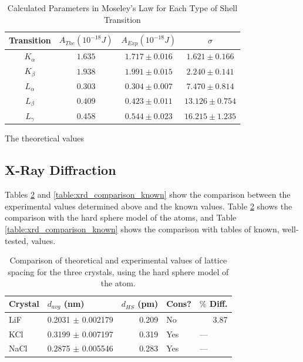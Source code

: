 \documentclass[%
 reprint,
 amsmath,amssymb,
 aps,
 pra,
]{revtex4-1}
\begin{document}
\begin{table}[htbp]
	\begin{center}
		\begin{tabular}{|c|c|c|c|}
			\hline Transition & $A_{The} (10^{-18} J)$  & $A_{Exp} (10^{-18} J) $ & $\sigma$ \\
			\hline $K_{\alpha}$ & $1.635$ & $1.717 \pm 0.016$ & $1.621 \pm 0.166$ \\
			\hline $K_{\beta}$ & $1.938$ & $1.991 \pm 0.015$ & $2.240 \pm 0.141$ \\
			\hline $L_{\alpha}$ & $0.303$ & $0.304 \pm 0.007$ & $7.470 \pm 0.814$ \\
			\hline $L_{\beta}$ & $0.409$ & $0.423 \pm 0.011$ & $13.126 \pm 0.754$ \\
			\hline $L_{\gamma}$ & $0.458$ & $0.544 \pm 0.023$ & $16.215 \pm 1.235$ \\
			\hline
		\end{tabular}
	\end{center}
	\caption{Calculated Parameters in Moseley's Law for Each Type of Shell Transition}
	\label{Tab:MoseLawSummary}
\end{table}

The theoretical values 

\subsection{X-Ray Diffraction}

Tables \ref{table:xrd_comparison_hard_sphere} and \ref{table:xrd_comparison_known} show the comparison between the experimental values determined above and the known values. Table \ref{table:xrd_comparison_hard_sphere} shows the comparison with the hard sphere model of the atoms, and Table \ref{table:xrd_comparison_known} shows the comparison with tables of known, well-tested, values.

\begin{table}[htbp]
	\begin{center}
	\begin{tabular}{|l|r|r|l|l|}
		\hline
		Crystal & \multicolumn{1}{l|}{$d_{avg}$ (nm)}  & \multicolumn{1}{l|}{$d_{HS}$ (pm)} & Cons? & $\%$ Diff. \\ \hline
		LiF & 0.2031 $\pm$ 0.002179 & 0.209 & No & \multicolumn{1}{r|}{3.87} \\ \hline
		KCl & 0.3199 $\pm$ 0.007197 & 0.319 & Yes & --- \\ \hline
		NaCl & 0.2875 $\pm$ 0.005546 & 0.283 & Yes & --- \\ \hline
	\end{tabular}
	\end{center}
	\caption{Comparison of theoretical and experimental values of lattice spacing for the three crystals, using the hard sphere model of the atom.}
	\label{table:xrd_comparison_hard_sphere}
\end{table}
\end{document}
